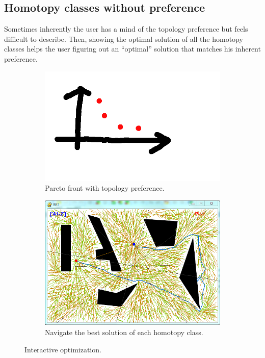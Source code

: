 \documentclass[letterpaper, 10 pt, conference]{ieeeconf}
\begin{document}
\subsection{Homotopy classes without preference}

Sometimes inherently the user has a mind of the topology preference but feels difficult to describe.
Then, showing the optimal solution of all the homotopy classes helps the user figuring out an ``optimal'' solution that matches his inherent preference.

\begin{figure}
	\centering
	\begin{subfigure}[t]{0.47\linewidth}
		\centering
		\includegraphics[width=\textwidth]{fig/pareto.png}
		\caption{Pareto front with topology preference.}
		\label{fig:homotopy_human_interaction:pareto}
	\end{subfigure}  
	\begin{subfigure}[t]{0.47\linewidth}
		\centering
		\includegraphics[width=\textwidth]{fig/navBestInHomotopy.png}
		\caption{Navigate the best solution of each homotopy class.}
		\label{fig:homotopy_human_interaction:all}
	\end{subfigure}   
	\caption{Interactive optimization.}
	\label{fig:homotopy_human_interaction}
\end{figure}
\end{document}
